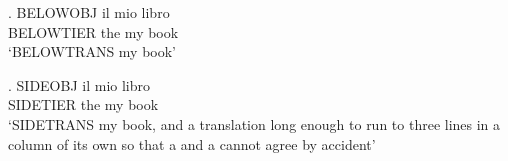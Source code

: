 

\ex. \gll BELOWOBJ il mio libro\\
          BELOWTIER the my book\\
     \glt `BELOWTRANS my book'

{\GlossTransSide
\ex. \gll SIDEOBJ il mio libro\\
          SIDETIER the my book\\
     \glt `SIDETRANS my book, and a translation long enough to run to
           three lines in a column of its own so that a \string\vbox\space
           and a \string\vtop\space cannot agree by accident'
}

